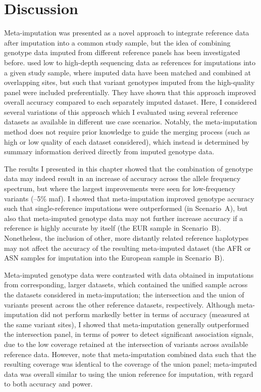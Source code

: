 %
\section{Discussion}
\label{metaimpute_discussion}
%

Meta-imputation was presented as a novel approach to integrate reference data after imputation into a common study sample, but the idea of combining genotype data imputed from different reference panels has been investigated before.
 used low to high-depth sequencing data as references for imputations into a given study sample, where imputed data have been matched and combined at overlapping sites, but such that variant genotypes imputed from the high-quality panel were included preferentially.
They have shown that this approach improved overall accuracy compared to each separately imputed dataset.
Here, I considered several variations of this approach which I evaluated using several reference datasets as available in different use case scenarios.
Notably, the meta-imputation method does not require prior knowledge to guide the merging process (such as high or low quality of each dataset considered), which instead is determined by summary information derived directly from imputed genotype data.

The results I presented in this chapter showed that the combination of genotype data may indeed result in an increase of accuracy across the allele frequency spectrum, but where the largest improvements were seen for low-frequency variants (--5\% \gls{maf}).
I showed that meta-imputation improved genotype accuracy such that single-reference imputations were outperformed (\eg in Scenario~A), but also that meta-imputed genotype data may not further increase accuracy if a reference is highly accurate by itself (\eg the EUR sample in Scenario~B).
Nonetheless, the inclusion of other, more distantly related reference haplotypes may not affect the accuracy of the resulting meta-imputed dataset (\eg the AFR or ASN samples for imputation into the European sample in Scenario~B).

Meta-imputed genotype data were contrasted with data obtained in imputations from corresponding, larger datasets, which contained the unified sample across the datasets considered in meta-imputation; \ie the intersection and the union of variants present across the other reference datasets, respectively.
Although meta-imputation did not perform markedly better in terms of accuracy (measured at the same variant sites), I showed that meta-imputation generally outperformed the intersection panel, in terms of power to detect significant association signals, due to the low coverage retained at the intersection of variants across available reference data.
However, note that meta-imputation combined data such that the resulting coverage was identical to the coverage of the union panel; meta-imputed data was overall similar to using the union reference for imputation, with regard to both accuracy and power.

